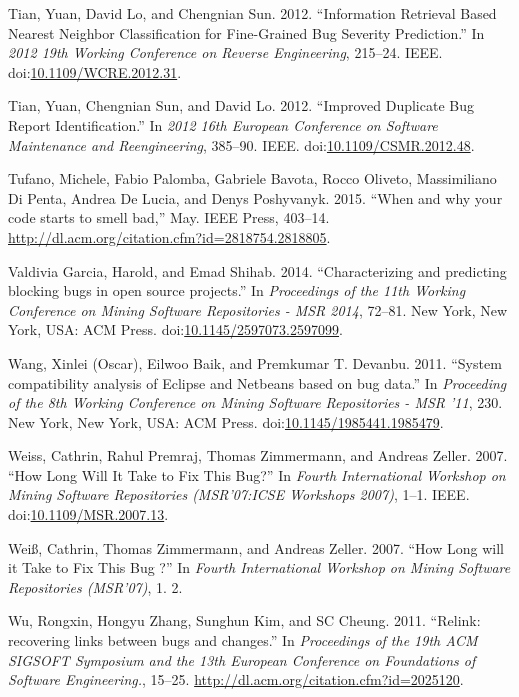 \documentclass[natbib]{svjour3}
\begin{document}
\hypertarget{ref-Tian2012}{}
Tian, Yuan, David Lo, and Chengnian Sun. 2012. ``Information Retrieval
Based Nearest Neighbor Classification for Fine-Grained Bug Severity
Prediction.'' In \emph{2012 19th Working Conference on Reverse
Engineering}, 215--24. IEEE.
doi:\href{https://doi.org/10.1109/WCRE.2012.31}{10.1109/WCRE.2012.31}.

\hypertarget{ref-Tian2012a}{}
Tian, Yuan, Chengnian Sun, and David Lo. 2012. ``Improved Duplicate Bug
Report Identification.'' In \emph{2012 16th European Conference on
Software Maintenance and Reengineering}, 385--90. IEEE.
doi:\href{https://doi.org/10.1109/CSMR.2012.48}{10.1109/CSMR.2012.48}.

\hypertarget{ref-Tufano2015}{}
Tufano, Michele, Fabio Palomba, Gabriele Bavota, Rocco Oliveto,
Massimiliano Di Penta, Andrea De Lucia, and Denys Poshyvanyk. 2015.
``When and why your code starts to smell bad,'' May. IEEE Press,
403--14. \url{http://dl.acm.org/citation.cfm?id=2818754.2818805}.

\hypertarget{ref-ValdiviaGarcia2014}{}
Valdivia Garcia, Harold, and Emad Shihab. 2014. ``Characterizing and
predicting blocking bugs in open source projects.'' In \emph{Proceedings
of the 11th Working Conference on Mining Software Repositories - MSR
2014}, 72--81. New York, New York, USA: ACM Press.
doi:\href{https://doi.org/10.1145/2597073.2597099}{10.1145/2597073.2597099}.

\hypertarget{ref-Wang2011}{}
Wang, Xinlei (Oscar), Eilwoo Baik, and Premkumar T. Devanbu. 2011.
``System compatibility analysis of Eclipse and Netbeans based on bug
data.'' In \emph{Proceeding of the 8th Working Conference on Mining
Software Repositories - MSR '11}, 230. New York, New York, USA: ACM
Press.
doi:\href{https://doi.org/10.1145/1985441.1985479}{10.1145/1985441.1985479}.

\hypertarget{ref-Weiss2007}{}
Weiss, Cathrin, Rahul Premraj, Thomas Zimmermann, and Andreas Zeller.
2007. ``How Long Will It Take to Fix This Bug?'' In \emph{Fourth
International Workshop on Mining Software Repositories (MSR'07:ICSE
Workshops 2007)}, 1--1. IEEE.
doi:\href{https://doi.org/10.1109/MSR.2007.13}{10.1109/MSR.2007.13}.

\hypertarget{ref-Weiuxdf2007}{}
Weiß, Cathrin, Thomas Zimmermann, and Andreas Zeller. 2007. ``How Long
will it Take to Fix This Bug ?'' In \emph{Fourth International Workshop
on Mining Software Repositories (MSR'07)}, 1. 2.

\hypertarget{ref-Wu2011}{}
Wu, Rongxin, Hongyu Zhang, Sunghun Kim, and SC Cheung. 2011. ``Relink:
recovering links between bugs and changes.'' In \emph{Proceedings of the
19th ACM SIGSOFT Symposium and the 13th European Conference on
Foundations of Software Engineering.}, 15--25.
\url{http://dl.acm.org/citation.cfm?id=2025120}.
\end{document}
